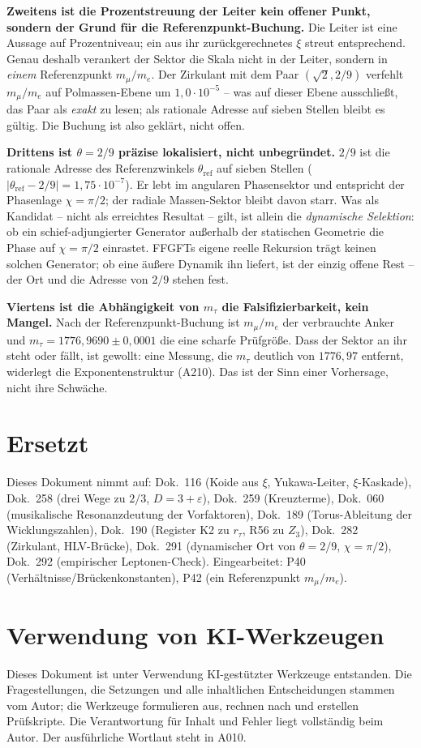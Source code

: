 \textbf{Zweitens ist die Prozentstreuung der Leiter kein offener Punkt, sondern
der Grund für die Referenzpunkt-Buchung.} Die Leiter ist eine Aussage auf
Prozentniveau; ein aus ihr zurückgerechnetes $\xi$ streut entsprechend. Genau
deshalb verankert der Sektor die Skala nicht in der Leiter, sondern in \emph{einem}
Referenzpunkt $m_\mu/m_e$. Der Zirkulant mit dem Paar
$(\sqrt2, 2/9)$ verfehlt $m_\mu/m_e$ auf Polmassen-Ebene um $1{,}0\cdot10^{-5}$
-- was auf dieser Ebene ausschließt, das Paar als \emph{exakt} zu lesen; als
rationale Adresse auf sieben Stellen bleibt es gültig. Die Buchung ist also
geklärt, nicht offen.

\textbf{Drittens ist $\theta=2/9$ präzise lokalisiert, nicht unbegründet.} $2/9$
ist die rationale Adresse des Referenzwinkels $\theta_\text{ref}$ auf sieben
Stellen ($|\theta_\text{ref}-2/9| = 1{,}75\cdot10^{-7}$). Er lebt im angularen
Phasensektor und entspricht der Phasenlage $\chi=\pi/2$; der radiale
Massen-Sektor bleibt davon starr. Was als Kandidat -- nicht als erreichtes
Resultat -- gilt, ist allein die \emph{dynamische Selektion}: ob ein
schief-adjungierter Generator außerhalb der statischen Geometrie die Phase auf
$\chi=\pi/2$ einrastet. FFGFTs eigene reelle Rekursion trägt keinen
solchen Generator; ob eine äußere Dynamik ihn liefert, ist der einzig offene
Rest -- der Ort und die Adresse von $2/9$ stehen fest.

\textbf{Viertens ist die Abhängigkeit von $m_\tau$ die Falsifizierbarkeit, kein
Mangel.} Nach der Referenzpunkt-Buchung ist $m_\mu/m_e$ der verbrauchte
Anker und $m_\tau = 1776{,}9690\pm0{,}0001$ die eine scharfe Prüfgröße. Dass der
Sektor an ihr steht oder fällt, ist gewollt: eine Messung, die $m_\tau$ deutlich
von $1776{,}97$ entfernt, widerlegt die Exponentenstruktur (A210). Das ist der
Sinn einer Vorhersage, nicht ihre Schwäche.

\section{Ersetzt}

Dieses Dokument nimmt auf: Dok.~116 (Koide aus $\xi$, Yukawa-Leiter, $\xi$-Kaskade),
Dok.~258 (drei Wege zu $2/3$, $D=3+\varepsilon$), Dok.~259 (Kreuzterme),
Dok.~060 (musikalische Resonanzdeutung der Vorfaktoren), Dok.~189 (Torus-Ableitung der Wicklungszahlen), Dok.~190 (Register K2 zu $r_\tau$, R56 zu $Z_3$), Dok.~282 (Zirkulant, HLV-Brücke), Dok.~291 (dynamischer Ort von $\theta=2/9$,
$\chi=\pi/2$), Dok.~292 (empirischer Leptonen-Check).
Eingearbeitet: P40 (Verhältnisse/Brückenkonstanten), P42 (ein Referenzpunkt
$m_\mu/m_e$).

\section{Verwendung von KI-Werkzeugen}

Dieses Dokument ist unter Verwendung KI-gestützter Werkzeuge entstanden. Die
Fragestellungen, die Setzungen und alle inhaltlichen Entscheidungen stammen vom
Autor; die Werkzeuge formulieren aus, rechnen nach und erstellen Prüfskripte.
Die Verantwortung für Inhalt und Fehler liegt vollständig beim Autor. Der
ausführliche Wortlaut steht in A010.
